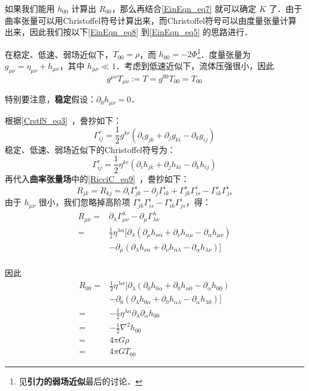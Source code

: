 如果我们能用 $h_{00}$ 计算出 $R_{00}$，那么再结合\autoref{EinEqn_eq7} 就可以确定 $K$ 了．由于曲率张量可以用Christoffel符号计算出来，而Christoffel符号可以由度量张量计算出来，因此我们按以下\autoref{EinEqn_eq8} 到\autoref{EinEqn_eq5} 的思路进行．

在稳定、低速、弱场近似下，$T_{00}=\rho$，而 $h_{00}=-2\Phi$\footnote{见\textbf{引力的弱场近似}最后的讨论．}．度量张量为 $g_{\mu\nu}=\eta_{\mu\nu}+h_{\mu\nu}$，其中 $h_{\mu\nu}\ll 1$．考虑到低速近似下，流体压强很小，因此 
\begin{equation}\label{EinEqn_eq10}
g^{\mu\nu}T_{\mu\nu}:=T=g^{00}T_{00}=T_{00}
\end{equation}

特别要注意，\textbf{稳定}假设：$\partial_0h_{\mu\nu}=0$．


根据\autoref{CrstfS_eq3}~，誊抄如下：
\begin{equation}\label{EinEqn_eq8}
\Gamma^{r}_{ij}=\frac{1}{2}g^{kr}(\partial_ig_{jk}+\partial_jg_{ki}-\partial_kg_{ij})
\end{equation}
稳定、低速、弱场近似下的Christoffel符号为：
\begin{equation}
\Gamma^{r}_{ij}=\frac{1}{2}\eta^{kr}(\partial_ih_{jk}+\partial_jh_{ki}-\partial_kh_{ij})
\end{equation}
再代入\textbf{曲率张量场}中的\autoref{RicciC_eq9}~，誊抄如下：
\begin{equation}
R_{jk}=R_{kj}=\partial_i\Gamma^i_{jk}-\partial_j\Gamma^{i}_{ik}+\Gamma^s_{jk}\Gamma^i_{is}-\Gamma^s_{ik}\Gamma^i_{js}
\end{equation}
由于 $h_{\mu\nu}$ 很小，我们忽略掉高阶项 $\Gamma^s_{jk}\Gamma^i_{is}-\Gamma^s_{ik}\Gamma^i_{js}$，得：
\begin{equation}
\begin{aligned}
R_{\mu\nu}=&\partial_\lambda\Gamma^\lambda_{\mu\nu}-\partial_{\mu}\Gamma^\lambda_{\lambda\nu}\\
=&\frac{1}{2}\eta^{\lambda\alpha}[\partial_\lambda(\partial_\mu h_{\nu \alpha}+\partial_\nu h_{\alpha\mu}-\partial_\alpha h_{\mu\nu})\\
&-\partial_\mu(\partial_\lambda h_{\nu\alpha}+\partial_\nu h_{\alpha\lambda}-\partial_\alpha h_{\lambda\nu})]\\
\end{aligned}
\end{equation}

因此
\begin{equation}\label{EinEqn_eq5}
\begin{aligned}
R_{00}=&\frac{1}{2}\eta^{\lambda\alpha}[\partial_\lambda(\partial_0 h_{0 \alpha}+\partial_0 h_{\alpha0}-\partial_\alpha h_{00})\\
&-\partial_0(\partial_\lambda h_{0\alpha}+\partial_0 h_{\alpha\lambda}-\partial_\alpha h_{\lambda0})]\\
=&-\frac{1}{2}\eta^{\lambda\alpha}\partial_\lambda\partial_\alpha h_{00}\\
=&-\frac{1}{2}\nabla^2 h_{00}\\
=&4\pi G\rho\\
=&4\pi GT_{00}
\end{aligned}
\end{equation}

